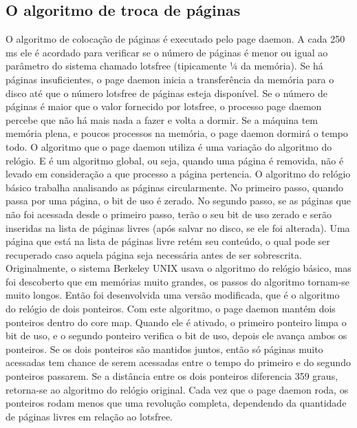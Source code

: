 \subsection{O algoritmo de troca de páginas}
O algoritmo de colocação de páginas é executado pelo page daemon. A cada 250 ms ele é acordado para verificar se o número de páginas é menor ou igual ao parâmetro do sistema chamado lotsfree (tipicamente ¼ da memória). Se há páginas insuficientes, o page daemon inicia a transferência da memória para o disco até que o número lotsfree de páginas esteja disponível. Se o número de páginas é maior que o valor fornecido por lotsfree, o processo page daemon percebe que não há mais nada a fazer e volta a dormir. Se a máquina tem memória plena, e poucos processos na memória, o page daemon dormirá o tempo todo.
O algoritmo que o page daemon utiliza é uma variação do algoritmo do relógio. E é um algoritmo global, ou seja, quando uma página é removida, não é levado em consideração a que processo a página pertencia.
O algoritmo do relógio básico trabalha analisando as páginas circularmente. No primeiro passo, quando passa por uma página, o bit de uso é zerado. No segundo passo, se as páginas que não foi acessada desde o primeiro passo, terão o seu bit de uso zerado e serão inseridas na lista de páginas livres (após salvar no disco, se ele foi alterada). Uma página que está na lista de páginas livre retém seu conteúdo, o qual pode ser recuperado caso aquela página seja necessária antes de ser sobrescrita.
Originalmente, o sistema Berkeley UNIX usava o algoritmo do relógio básico, mas foi descoberto que em memórias muito grandes, os passos do algoritmo tornam-se muito longos. Então foi desenvolvida uma versão modificada, que é o algoritmo do relógio de dois ponteiros. Com este algoritmo, o page daemon mantém dois ponteiros dentro do core map. Quando ele é ativado, o primeiro ponteiro limpa o bit de uso, e o segundo ponteiro verifica o bit de uso, depois ele avança ambos os ponteiros. Se os dois ponteiros são mantidos juntos, então só páginas muito acessadas tem chance de serem acessadas entre o tempo do primeiro e do segundo ponteiros passarem. Se a distância entre os dois ponteiros diferencia 359 graus, retorna-se ao algoritmo do relógio original. Cada vez que o page daemon roda, os ponteiros rodam menos que uma revolução completa, dependendo da quantidade de páginas livres em relação ao lotsfree.
